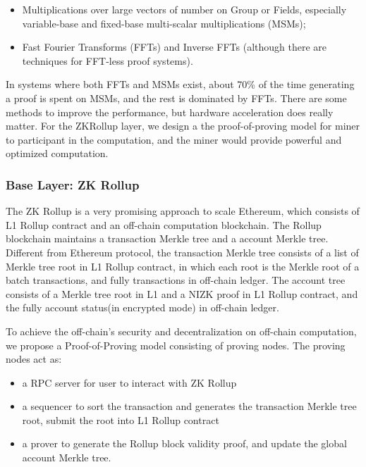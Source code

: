 \documentclass{article}
\begin{document}
\begin{itemize}
    \item Multiplications over large vectors of number on Group or Fields, especially variable-base and fixed-base multi-scalar multiplications (MSMs);
    \item Fast Fourier Transforms (FFTs) and Inverse FFTs (although there are techniques for FFT-less proof systems).
\end{itemize}

In systems where both FFTs and MSMs exist, about 70\% of the time generating a proof is spent on MSMs, and the rest is dominated by FFTs. There are some methods to improve the performance, but hardware acceleration does really matter.  For the ZKRollup layer, we design a the proof-of-proving model for miner to participant in the computation, and the miner would provide powerful and optimized computation.


\subsubsection{Base Layer: ZK Rollup}

The ZK Rollup is a very promising approach to scale Ethereum, which consists of L1 Rollup contract and an off-chain computation blockchain. The Rollup blockchain maintains a transaction Merkle tree and a account Merkle tree. Different from Ethereum protocol, the transaction Merkle tree consists of a list of Merkle tree root in L1 Rollup contract, in which each root is the Merkle root of a batch transactions, and fully transactions in off-chain ledger. The account tree consists of a Merkle tree root in L1 and a NIZK proof in L1 Rollup contract, and the fully account status(in encrypted mode) in off-chain ledger.

To achieve the off-chain's security and decentralization on off-chain computation, we propose a Proof-of-Proving model consisting of proving nodes. The proving nodes act as:
\begin{itemize}
    \item a RPC server for user to interact with ZK Rollup
    \item a sequencer to sort the transaction and generates the transaction Merkle tree root, submit the root into L1 Rollup contract
    \item a prover to generate the Rollup block validity proof, and update the global account Merkle tree.
\end{itemize}
\end{document}
